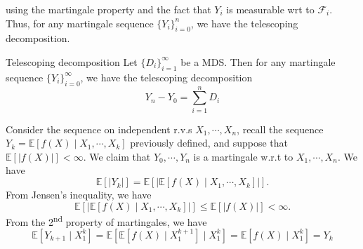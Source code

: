 \documentclass[10pt,handout,english]{beamer}
\newcommand{\ts}{\textsuperscript}
\newcommand{\E}{\mathbb{E}}
\newcommand{\F}{\mathcal{F}}
\newcommand{\1}{\mathbbm{1}}
\begin{document}
\begin{frame}[allowframebreaks]
using the martingale property and the fact that $Y_i$ is measurable wrt to $\F_i$. Thus, for any martingale sequence $\{Y_i\}_{i=0}^{n}$, we have the telescoping decomposition.
\begin{block}{Telescoping decomposition}
Let $\{D_i\}_{i=1}^{\infty}$ be a MDS. Then for any martingale sequence $\{Y_i\}_{i=0}^{\infty}$, we have the telescoping decomposition
\[
Y_n-Y_0=\sum\limits_{i=1}^{n}D_i
\]
\end{block} 
\begin{example}
Consider the sequence on independent r.v.s $X_1,\cdots,X_n$, recall the sequence $Y_{k}=\E[f(X)\mid X_1,\cdots,X_k]$ previously defined, and suppose that $\E[\lvert f(X) \rvert]<\infty$. We claim that $Y_0,\cdots,Y_n$ is a martingale w.r.t to $X_1,\cdots,X_n$. We have
\[
\E[\lvert Y_k\rvert]=\E[\lvert\E[f(X)\mid X_1,\cdots,X_k]\rvert].
\] 
From Jensen's inequality, we have 
\[
\E[\lvert\E[f(X)\mid X_1,\cdots,X_k]\rvert]\leq\E[\lvert f(X)\rvert]<\infty.
\] 
From the 2\ts{nd} property of martingales, we have
\[ 
\E[Y_{k+1}\mid X_{1}^k]=\E[\E[f(X)\mid X_{1}^{k+1}]\mid X_{1}^{k}]=\E[f(X)\mid X_{1}^{k}]=Y_k
\]
\end{example}
\end{frame}
\end{document}
